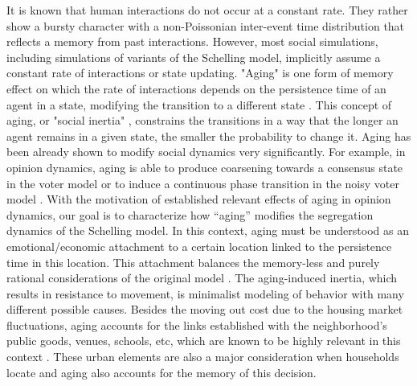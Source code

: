 It is known that human interactions do not occur at a constant rate. They rather show  a bursty character with a non-Poissonian inter-event time distribution that reflects a memory from past interactions. \cite{barabasi-2005,moro,oriol,rybski-2012,zignani-2016,kumar-2020}
However, most social simulations, including simulations of variants of the Schelling model, implicitly assume a constant rate of interactions or state updating. "Aging" is one form of memory effect on which the rate of interactions depends on the persistence time of an agent in a state, modifying the transition to a different state \cite{fernandez-gracia-2011,perez-2016,boguna-2014}. This concept of aging, or "social inertia" \cite{Stark2008}, constrains the transitions in a way that the longer an agent remains in a given state, the smaller the probability to change it. Aging has been already shown to modify social dynamics very significantly. For example, in opinion dynamics, aging is able to produce coarsening towards a consensus state in the voter model \cite{fernandez-gracia-2011,peralta-2020} or to induce a continuous phase transition in the noisy voter model \cite{artime-2018}. With the motivation of  established relevant effects of aging in opinion dynamics, our goal is to characterize how ``aging'' modifies the segregation dynamics of the Schelling model. In this context, aging must be understood as an emotional/economic attachment to a certain location linked to the persistence time in this location. This attachment balances the memory-less and purely rational considerations of the original model \cite{granovetter-1985}. The aging-induced inertia, which results in resistance to movement, is minimalist modeling of behavior with many different possible causes. Besides the moving out cost due to the housing market fluctuations, aging accounts for the links established with the neighborhood’s public goods, venues, schools, etc, which are known to be highly relevant in this context \cite{wasserman-2001,chetty-2016,silver-2021}. These urban elements are also a major consideration when households locate \cite{denton1995persistence,clark-2002,clark-2003,silver2016scenescapes} and aging also accounts for the memory of this decision.


